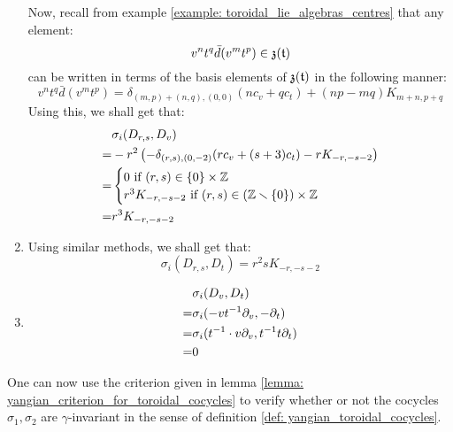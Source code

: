 \begin{example}
\begin{enumerate}
$$                    $$
                Now, recall from example \ref{example: toroidal_lie_algebras_centres} that any element:
                    $$v^n t^q \bar{d}(v^m t^p) \in \mathfrak{z}(\mathfrak{t})$$
                can be written in terms of the basis elements of $\mathfrak{z}(\mathfrak{t})$ in the following manner:
                    $$v^n t^q \bar{d}(v^m t^p) = \delta_{(m, p) + (n, q), (0, 0)} ( n c_v + q c_t ) + (np - mq) K_{m + n, p + q}$$
                Using this, we shall get that:
                    $$
                        \begin{aligned}
                            & \sigma_i(D_{r, s}, D_v)
                            \\
                            = & -r^2 \left( -\delta_{(r, s), (0, -2)} ( r c_v + (s + 3) c_t ) - r K_{-r, -s - 2} \right)
                            \\
                            = &
                            \begin{cases}
                                \text{$0$ if $(r, s) \in \{0\} \x \Z$}
                                \\
                                \text{$r^3 K_{-r, -s - 2}$ if $(r, s) \in (\Z \setminus \{0\}) \x \Z$}
                            \end{cases}
                            \\
                            = & r^3 K_{-r, -s - 2}
                        \end{aligned}
                    $$
                \item Using similar methods, we shall get that:
                    $$\sigma_i(D_{r, s}, D_t) = r^2s K_{-r, -s - 2}$$
                \item
                    $$
                        \begin{aligned}
                            & \sigma_i(D_v, D_t)
                            \\
                            = & \sigma_i(-v t^{-1} \partial_v, -\partial_t)
                            \\
                            = & \sigma_i(t^{-1} \cdot v \partial_v, t^{-1} t \partial_t)
                            \\
                            = & 0
                        \end{aligned}
                    $$
            \end{enumerate}
            One can now use the criterion given in lemma \ref{lemma: yangian_criterion_for_toroidal_cocycles} to verify whether or not the cocycles $\sigma_1, \sigma_2$ are $\gamma$-invariant in the sense of definition \ref{def: yangian_toroidal_cocycles}.
        \end{example}
